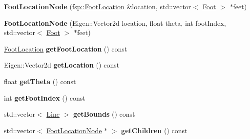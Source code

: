 \begin{DoxyCompactItemize}
\item 
\hypertarget{classfsp_1_1_foot_location_node_af86ee3e7947bb36d1442aa19fdcef384}{{\bfseries Foot\-Location\-Node} (\hyperlink{classfsp_1_1_foot_location}{fsp\-::\-Foot\-Location} \&location, std\-::vector$<$ \hyperlink{classfsp_1_1_foot}{Foot} $>$ $\ast$feet)}\label{classfsp_1_1_foot_location_node_af86ee3e7947bb36d1442aa19fdcef384}

\item 
\hypertarget{classfsp_1_1_foot_location_node_a70f04a153a1cca30c36c04be5234689f}{{\bfseries Foot\-Location\-Node} (Eigen\-::\-Vector2d location, float theta, int foot\-Index, std\-::vector$<$ \hyperlink{classfsp_1_1_foot}{Foot} $>$ $\ast$feet)}\label{classfsp_1_1_foot_location_node_a70f04a153a1cca30c36c04be5234689f}

\item 
\hypertarget{classfsp_1_1_foot_location_node_ae766545605561eea9906a608b3a2fc5a}{\hyperlink{classfsp_1_1_foot_location}{Foot\-Location} {\bfseries get\-Foot\-Location} () const }\label{classfsp_1_1_foot_location_node_ae766545605561eea9906a608b3a2fc5a}

\item 
\hypertarget{classfsp_1_1_foot_location_node_af5b33a9ac898d4728ea74c99a70bde0b}{Eigen\-::\-Vector2d {\bfseries get\-Location} () const }\label{classfsp_1_1_foot_location_node_af5b33a9ac898d4728ea74c99a70bde0b}

\item 
\hypertarget{classfsp_1_1_foot_location_node_a7a7510257b93f464ed7591aea27b37da}{float {\bfseries get\-Theta} () const }\label{classfsp_1_1_foot_location_node_a7a7510257b93f464ed7591aea27b37da}

\item 
\hypertarget{classfsp_1_1_foot_location_node_afeaed15274f574fdd823599c75c04156}{int {\bfseries get\-Foot\-Index} () const }\label{classfsp_1_1_foot_location_node_afeaed15274f574fdd823599c75c04156}

\item 
\hypertarget{classfsp_1_1_foot_location_node_aff440a360a6670f18128976051d261bf}{std\-::vector$<$ \hyperlink{classfsp_1_1_line}{Line} $>$ {\bfseries get\-Bounds} () const }\label{classfsp_1_1_foot_location_node_aff440a360a6670f18128976051d261bf}

\item 
\hypertarget{classfsp_1_1_foot_location_node_a0c9dbb12bc7579091fbfce3d9653dfaa}{std\-::vector$<$ \hyperlink{classfsp_1_1_foot_location_node}{Foot\-Location\-Node} $\ast$ $>$ {\bfseries get\-Children} () const }\label{classfsp_1_1_foot_location_node_a0c9dbb12bc7579091fbfce3d9653dfaa}


\end{DoxyCompactItemize}
